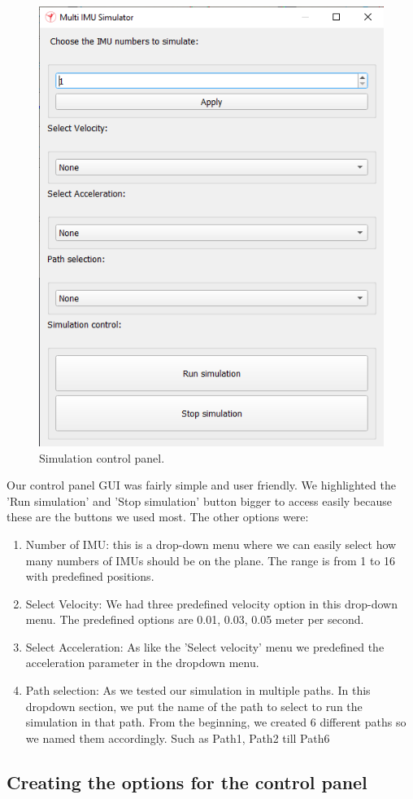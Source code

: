 \begin{figure}[h]
  \centering
    \includegraphics[width=0.6\linewidth]{figures/simCPanel.png}
    \caption{Simulation control panel.}
\label{fig:simCP}
\end{figure}


Our control panel GUI was fairly simple and user friendly. We highlighted the 'Run simulation' and 'Stop simulation' button bigger to access easily because these are the buttons we used most. 
The other options were:
\begin{enumerate}
  \item Number of IMU: this is a drop-down menu where we can easily select how many numbers of IMUs should be on the plane. The range is from 1 to 16 with predefined positions.
  \item Select Velocity: We had three predefined velocity option in this drop-down menu. The predefined options are 0.01, 0.03, 0.05 meter per second.
  \item Select Acceleration: As like the 'Select velocity'  menu we predefined the acceleration parameter in the dropdown menu.
  \item Path selection: As we tested our simulation in multiple paths. In this dropdown section, we put the name of the path to select to run the simulation in that path. From the beginning, we created 6 different paths so we named them accordingly. Such as Path1, Path2 till Path6 
\end{enumerate}


\subsection{Creating the options for the control panel}

